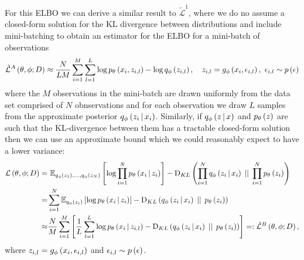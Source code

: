 \documentclass[../report.tex]{subfiles}
\begin{document}
For this ELBO we can derive a similar result to $\tilde{\mathcal{L}}^1$, where we do no assume a closed-form solution for the KL divergence between distributions and include mini-batching to obtain an estimator for the ELBO for a mini-batch of observations
\begin{equation}
  \tilde{\mathcal{L}}^A \left( \theta, \phi; D\right) \approx \frac{N}{LM} \sum_{i=1}^{M} \sum_{l=1}^{L} \log p_\theta \left( x_i, z_{i,l}\right) - \log q_\phi \left( z_{i,l}\right), \quad z_{i,l} = g_\phi \left( x_i, \epsilon_{i,l}\right),\,\, \epsilon_{i,l} \sim p \left( \epsilon\right)
\end{equation}
where the $M$ observations in the mini-batch are drawn uniformly from the data set comprised of $N$ obnservations and for each observation we draw $L$ samples from the approximate posterior $q_\phi \left(z_i \, \middle\vert \, x_i \right)$.
Similarly, if $q_\phi \left(z \, \middle\vert \, x \right)$ and $p_\theta \left( z\right)$ are such that the KL-divergence between them has a tractable closed-form solution then we can use an approximate bound which we could reasonably expect to have a lower variance:
\begin{align}
  \mathcal{L} \left( \theta, \phi; D\right) =& \,\,\mathbb{E}_{q_\phi \left( z_1\right),...,q_\phi \left( z_N\right)} \left[ \log \prod_{i=1}^{N} p_\theta \left(x_i \, \middle\vert \, z_i \right) \right] - \textrm{D}_{KL} \left( \prod_{i=1}^{N} q_\phi \left(z_i \, \middle\vert \, x_i \right) \, \mid \mid \, \prod_{i=1}^{N} p_\theta \left( z_i\right)\right) \nonumber \\
  =& \sum_{i=1}^{N} \mathbb{E}_{q_\phi \left( z_i\right)} \left[ \log p_\theta \left(x_i \, \middle\vert \, z_i \right) \right] - \textrm{D}_{KL} \left( q_\phi \left(z_i \, \middle\vert \, x_i \right) \, \mid \mid \, p_\theta \left( z_i\right)\right) \nonumber \\
  \approx& \frac{N}{M} \sum_{i=1}^{M} \left[ \frac{1}{L} \sum_{l=1}^{L} \log p_\theta \left(x_i \, \middle\vert \, z_{i,l} \right) - \textrm{D}_{KL} \left( q_{\phi} \left(z_i \, \middle\vert \, x_i \right) \, \mid \mid \, p_\theta \left( z_i\right)\right) \right] =: \tilde{\mathcal{L}}^B \left( \theta, \phi; D\right), \label{eqn:Lb}
\end{align}
where $z_{i,l} = g_\phi \left( x_i, \epsilon_{i,l}\right)$ and $\epsilon_{i,l} \sim p \left( \epsilon\right)$.
\end{document}

